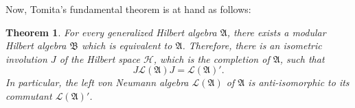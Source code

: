 \documentclass[12pt,b5paper,twoside]{article}
\theoremstyle{takesaki}
\newtheorem{theorem}{Theorem}[section]
\numberwithin{equation}{section}
\begin{document}
Now, Tomita's fundamental theorem is at hand as follows:

\begin{theorem}\label{thm:10.1}
For every generalized Hilbert algebra $\mathfrak A$, there exists a
modular Hilbert algebra $\mathfrak B$ which is equivalent to
$\mathfrak A$.  Therefore, there is an isometric involution $J$ of the
Hilbert space $\mathcal H$, which is the completion of $\mathfrak A$,
such that
\begin{equation}
  J\mathcal L(\mathfrak A)J=\mathcal L(\mathfrak A)'.
  \tag{10.2}\label{eq:10.2}
\end{equation}
In particular, the left von Neumann algebra $\mathcal L(\mathfrak A)$
of $\mathfrak A$ is anti-isomorphic to its commutant
$\mathcal L(\mathfrak A)'$.
\end{theorem}
\end{document}
